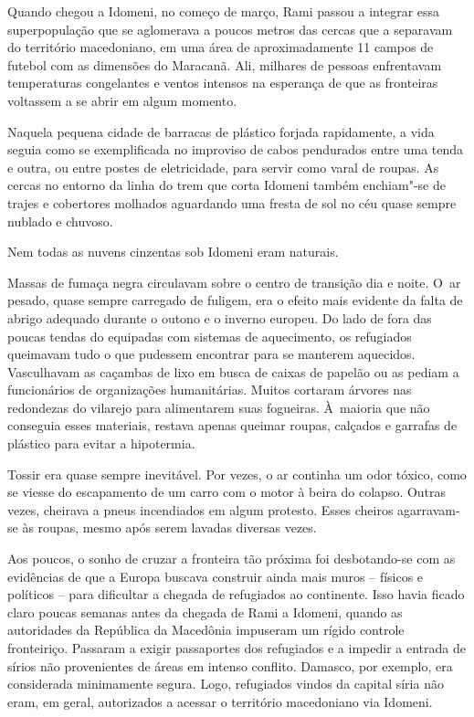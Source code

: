 Quando chegou a Idomeni, no começo de março, Rami passou a integrar essa
superpopulação que se aglomerava a poucos metros das cercas que a separavam 
do território macedoniano, em uma área de aproximadamente 11 campos de futebol
com as dimensões do Maracanã. Ali, milhares de pessoas enfrentavam 
temperaturas congelantes e ventos intensos na esperança de que as 
fronteiras voltassem a se abrir em algum momento.

Naquela pequena cidade de barracas de plástico forjada rapidamente, a vida  
seguia como se exemplificada no improviso de cabos pendurados entre uma tenda 
e outra, ou entre postes de eletricidade, para servir como varal de roupas. 
As cercas no entorno da linha do trem que corta Idomeni também enchiam"-se de 
trajes e cobertores molhados aguardando uma fresta de sol no céu quase sempre
nublado e chuvoso.

Nem todas as nuvens cinzentas sob Idomeni eram naturais.

Massas de fumaça negra circulavam sobre o centro de transição
dia e noite. O~ar pesado, quase sempre carregado de fuligem, era o
efeito mais evidente da falta de abrigo adequado durante o outono e o inverno 
europeu. Do lado de fora das poucas tendas do  equipadas com 
sistemas de aquecimento, os refugiados queimavam tudo o que pudessem encontrar
para se manterem aquecidos. Vasculhavam as caçambas de lixo em busca de 
caixas de papelão ou as pediam a funcionários de organizações humanitárias. 
Muitos cortaram árvores nas redondezas do vilarejo para alimentarem suas fogueiras. 
À~maioria que não conseguia esses materiais, restava apenas queimar 
roupas, calçados e garrafas de plástico para evitar a hipotermia.

Tossir era quase sempre inevitável. Por vezes, o ar continha um odor tóxico, como se viesse do escapamento 
de um carro com o motor à beira do colapso. Outras vezes, cheirava a pneus incendiados em algum protesto. 
Esses cheiros agarravam-se às roupas, mesmo após serem lavadas diversas vezes.
% 
% 
% 
%
%

% 
% 
Aos poucos, o sonho de cruzar a fronteira tão próxima foi desbotando-se 
com as evidências de que a Europa buscava construir ainda mais muros -- 
físicos e políticos -- para dificultar a chegada de refugiados ao continente. 
Isso havia ficado claro poucas semanas antes da chegada de Rami a Idomeni, 
quando as autoridades da República da Macedônia impuseram um rígido controle
fronteiriço. Passaram a exigir passaportes dos refugiados e a impedir a entrada
de sírios não provenientes de áreas em intenso conflito. Damasco, por exemplo,
era considerada minimamente segura. Logo, refugiados vindos da capital síria
não eram, em geral, autorizados a acessar o território macedoniano via Idomeni.

